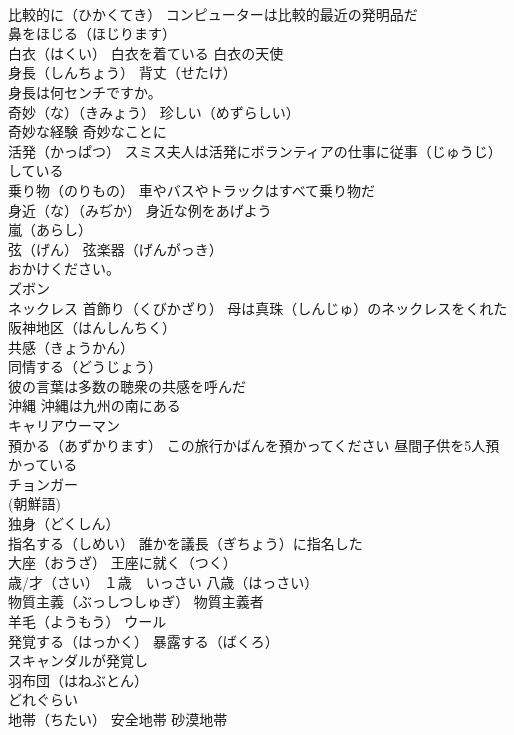 \documentclass[8pt]{extreport}
\begin{document}
\begin{CJK}{UTF8}{min}
\\	比較的に（ひかくてき） コンピューターは比較的最近の発明品だ
\\	鼻をほじる（ほじります）
\\	白衣（はくい） 白衣を着ている 白衣の天使
\\	身長（しんちょう） 背丈（せたけ）
\\	身長は何センチですか。
\\	奇妙（な）（きみょう） 珍しい（めずらしい）
\\	奇妙な経験 奇妙なことに
\\	活発（かっぱつ） スミス夫人は活発にボランティアの仕事に従事（じゅうじ）している
\\	乗り物（のりもの） 車やバスやトラックはすべて乗り物だ
\\	身近（な）（みぢか） 身近な例をあげよう
\\	嵐（あらし）
\\	弦（げん） 弦楽器（げんがっき）
\\	おかけください。
\\	ズボン
\\	ネックレス 首飾り（くびかざり） 母は真珠（しんじゅ）のネックレスをくれた
\\	阪神地区（はんしんちく）
\\	共感（きょうかん）
\\	同情する（どうじょう）
\\	彼の言葉は多数の聴衆の共感を呼んだ
\\	沖縄 沖縄は九州の南にある
\\	キャリアウーマン 
\\	預かる（あずかります） この旅行かばんを預かってください 昼間子供を5人預かっている
\\	チョンガー 
\\	(朝鮮語)
\\	独身（どくしん）
\\	指名する（しめい） 誰かを議長（ぎちょう）に指名した
\\	大座（おうざ） 王座に就く（つく）
\\	歳/才（さい） １歳　いっさい 八歳（はっさい）
\\	物質主義（ぶっしつしゅぎ） 物質主義者
\\	羊毛（ようもう） ウール
\\	発覚する（はっかく） 暴露する（ばくろ）
\\	スキャンダルが発覚し
\\	羽布団（はねぶとん）
\\	どれぐらい
\\	地帯（ちたい） 安全地帯 砂漠地帯

\end{CJK}
\end{document}
